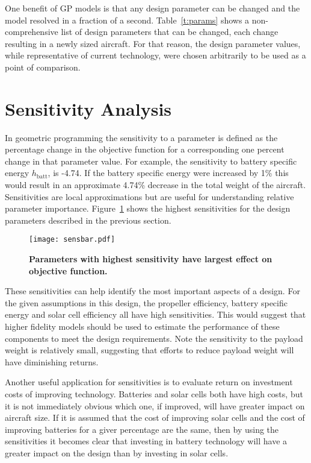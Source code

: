 \documentclass[]{aiaa-tc}%
\begin{document}
One benefit of GP models is that any design parameter can be changed and the model resolved in a fraction of a second.  
Table~\ref{t:params} shows a non-comprehensive list of design parameters that can be changed, each change resulting in a newly sized aircraft. 
For that reason, the design parameter values, while representative of current technology, were chosen arbitrarily to be used as a point of comparison.

\section{Sensitivity Analysis}

In geometric programming the sensitivity to a parameter is defined as the percentage change in the objective function for a corresponding one percent change in that parameter value.  
For example, the sensitivity to battery specific energy $h_{\mathrm{batt}}$, is -4.74.  If the battery specific energy were increased by 1\% this would result in an approximate 4.74\% decrease in the total weight of the aircraft.  
Sensitivities are local approximations but are useful for understanding relative parameter importance.  
Figure~\ref{f:sensbar} shows the highest sensitivities for the design parameters described in the previous section. 

\begin{figure}[h!]
	\begin{center}
	\texttt{[image: sensbar.pdf]}
    \caption{\textbf{Parameters with highest sensitivity have largest effect on objective function. }}
	\label{f:sensbar}
	\end{center}
\end{figure}


These sensitivities can help identify the most important aspects of a design. 
For the given assumptions in this design, the propeller efficiency, battery specific energy and solar cell efficiency all have high sensitivities. 
This would suggest that higher fidelity models should be used to estimate the performance of these components to meet the design requirements. 
Note the sensitivity to the payload weight is relatively small, suggesting that efforts to reduce payload weight will have diminishing returns. 

Another useful application for sensitivities is to evaluate return on investment costs of improving technology.  
Batteries and solar cells both have high costs, but it is not immediately obvious which one, if improved, will have greater impact on aircraft size.  
If it is assumed that the cost of improving solar cells and the cost of improving batteries for a giver percentage are the same, then by using the sensitivities it becomes clear that investing in battery technology will have a greater impact on the design than by investing in solar cells. 
\end{document}
